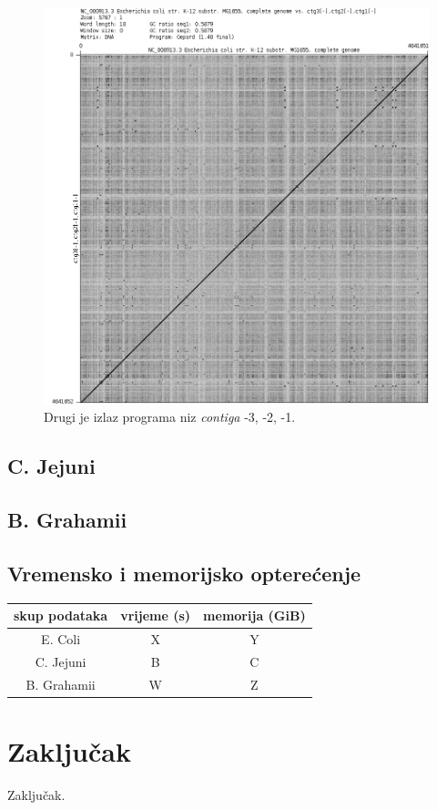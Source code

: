 \documentclass[times, utf8, seminar, numeric]{fer}
\begin{document}
\begin{figure}[h]
	\centering
	\includegraphics[width=0.7\linewidth]{img/ec_3_2_1_neg}
	\caption{Drugi je izlaz programa niz \textit{contiga} -3, -2, -1.}
	\label{fig:ec321neg}
\end{figure}

\section{C. Jejuni}
\section{B. Grahamii}
\section{Vremensko i memorijsko opterećenje}

\begin{center}
\begin{tabular}{|c||c|c|}
	\hline
	skup podataka & vrijeme (s) & memorija (GiB)\\
	\hline
	\hline
	E. Coli & X & Y \\
	\hline
	C. Jejuni & B & C \\
	\hline
	B. Grahamii & W & Z \\
	\hline
\end{tabular}
\end{center}

\chapter{Zaključak}
Zaključak.



\end{document}
